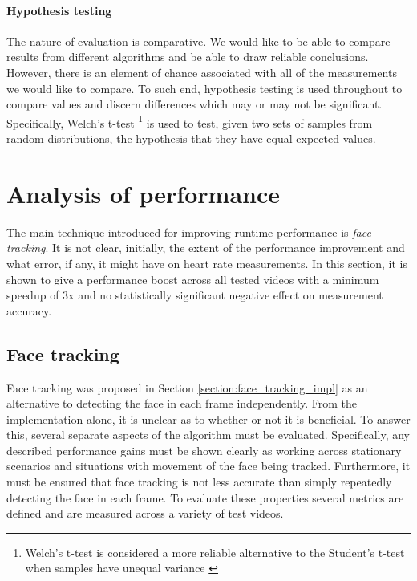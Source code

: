 


\paragraph{Hypothesis testing}
The nature of evaluation is comparative. We would like to be able to compare results from different algorithms and be able to draw reliable conclusions. However, there is an element of 
chance associated with all of the measurements we would like to compare.
To such end, hypothesis testing is used throughout to compare values and discern differences which may or may not be significant.
Specifically, Welch's t-test \cite{welch-t-test}\footnote{Welch's t-test is considered a more reliable alternative to the Student's t-test when samples have unequal variance \cite{superior-welch}}
is used to test, given two sets of samples from random distributions, the hypothesis that they have equal expected values. 


\section{Analysis of performance}
\label{section:face_tracking}
The main technique introduced for improving runtime performance is \textit{face tracking}. It is not clear, initially, the extent of the performance improvement and what error, if any, it might have 
on heart rate measurements. In this section, it is shown to give a performance boost across all tested videos with a minimum speedup of 3x and no statistically significant negative effect on measurement accuracy.

\subsection{Face tracking}
Face tracking was proposed in Section \ref{section:face_tracking_impl} as an alternative to detecting the face in each frame independently.
From the implementation alone, it is unclear as to whether or not it is beneficial. To answer this, several separate aspects of the algorithm must be evaluated. 
Specifically, any described performance gains must be shown clearly as working across stationary scenarios and situations with movement of the face being tracked. 
Furthermore, it must be ensured that face tracking is not less accurate than simply repeatedly detecting the face in each frame. 
To evaluate these properties several metrics are defined and are measured across a variety of test videos.
